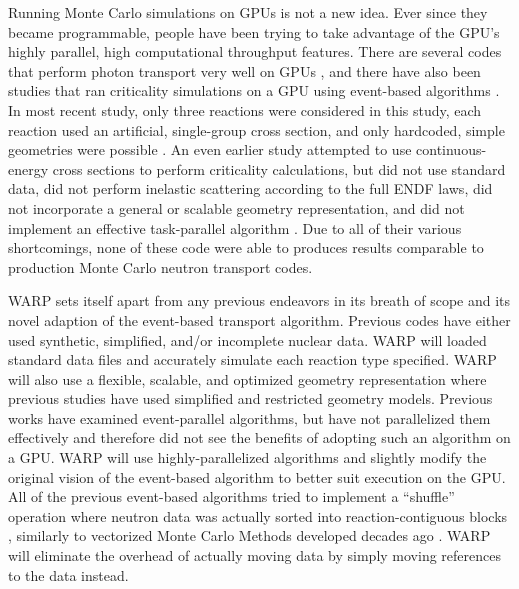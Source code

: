 Running Monte Carlo simulations on GPUs is not a new idea.  Ever since they became programmable, people have been trying to take advantage of the GPU's highly parallel, high computational throughput features.  There are several codes that perform photon transport very well on GPUs \cite{henderson,archer}, and there have also been studies that ran criticality simulations on a GPU using event-based algorithms \cite{tianyu,tianyu_snamc,nelson}.  In most recent study, only three reactions were considered in this study, each reaction used an artificial, single-group cross section, and only hardcoded, simple geometries were possible \cite{tianyu,tianyu_snamc}.  An even earlier study attempted to use continuous-energy cross sections to perform criticality calculations, but did not use standard data, did not perform inelastic scattering according to the full ENDF laws, did not incorporate a general or scalable geometry representation, and did not implement an effective task-parallel algorithm \cite{nelson}.  Due to all of their various shortcomings, none of these code were able to produces results comparable to production Monte Carlo neutron transport codes.

WARP sets itself apart from any previous endeavors in its breath of scope and its novel adaption of the event-based transport algorithm.  Previous codes have either used synthetic, simplified, and/or incomplete nuclear data.  WARP will loaded standard data files and accurately simulate each reaction type specified.  WARP will also use a flexible, scalable, and optimized geometry representation where previous studies have used simplified and restricted geometry models.  Previous works have examined event-parallel algorithms, but have not parallelized them effectively and therefore did not see the benefits of adopting such an algorithm on a GPU.  WARP will use highly-parallelized algorithms and slightly modify the original vision of the event-based algorithm to better suit execution on the GPU.  All of the previous event-based algorithms tried to implement a ``shuffle'' operation where neutron data was actually sorted into reaction-contiguous blocks \cite{nelson,tianyu_snamc}, similarly to vectorized Monte Carlo Methods developed decades ago \cite{vector,vujic_vector}.  WARP will eliminate the overhead of actually moving data by simply moving references to the data instead.

